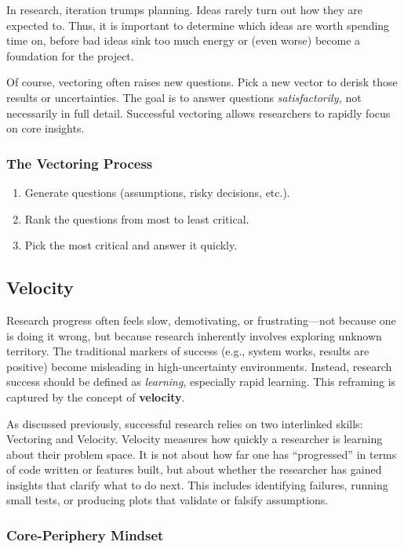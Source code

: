 In research, iteration trumps planning.
Ideas rarely turn out how they are expected to.
Thus, it is important to determine which ideas are worth spending time on, before bad ideas sink too much energy or (even worse) become a foundation for the project.

Of course, vectoring often raises new questions.
Pick a new vector to derisk those results or uncertainties.
The goal is to answer questions \textit{satisfactorily,} not necessarily in full detail.
Successful vectoring allows researchers to rapidly focus on core insights.

\subsubsection*{The Vectoring Process}
\begin{enumerate}
    \item Generate questions (assumptions, risky decisions, etc.).
    \item Rank the questions from most to least critical.
    \item Pick the most critical and answer it quickly.
\end{enumerate}

\subsection{Velocity}

Research progress often feels slow, demotivating, or frustrating---not because one is doing it wrong, but because research inherently involves exploring unknown territory.
The traditional markers of success (e.g., system works, results are positive) become misleading in high-uncertainty environments.
Instead, research success should be defined as \textit{learning}, especially rapid learning.
This reframing is captured by the concept of \textbf{velocity}.

As discussed previously, successful research relies on two interlinked skills: Vectoring and Velocity.
Velocity measures how quickly a researcher is learning about their problem space.
It is not about how far one has ``progressed'' in terms of code written or features built, but about whether the researcher has gained insights that clarify what to do next.
This includes identifying failures, running small tests, or producing plots that validate or falsify assumptions.

\subsubsection*{Core-Periphery Mindset}


